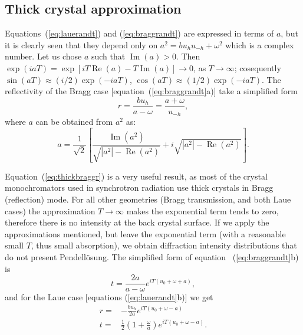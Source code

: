 \documentclass[preprint]{iucr}              %
\newcommand{\inred}[1]{{\color{red}#1}}
\begin{document}
\inred{
\subsection{Thick crystal approximation}\label{sec:thick}
}
Equations~(\ref{eq:lauerandt}) and (\ref{eq:braggrandt}) are expressed in terms of $a$, but it is clearly seen that they depend only on $a^2=bu_h u_{-h}+\omega^2$ which is a complex number. Let us chose $a$ such that $\operatorname{Im}(a)>0$. Then  
$\exp(iaT)=\exp[iT\operatorname{Re}(a)-T\operatorname{Im}(a)]\rightarrow 0$, as $T\rightarrow \infty$; cosequently $\sin(aT)\approx (i/2) \exp(-i a T)$, $\cos(aT)\approx (1/2) \exp(-i a T)$. The reflectivity of the Bragg case [equation~(\ref{eq:braggrandt}a)] take a simplified form
\begin{equation}\label{eq:thickbraggr}
    r = \frac{b u_h}{a-\omega} = \frac{a+\omega}{u_{-h}},
\end{equation}
where $a$ can be obtained from $a^2$ as: 
\begin{equation}
a = \frac{1}{\sqrt{2}} \left[ \frac{\operatorname{Im}(a^2)}{\sqrt{|a^2|-\operatorname{Re}(a^2)}} + i \sqrt{|a^2|-\operatorname{Re}(a^2)} \right].
\end{equation}

Equation~(\ref{eq:thickbraggr}) is a very useful result, as most of the crystal monochromators used in synchrotron radiation use thick crystals in Bragg (reflection) mode. For all other geometries (Bragg transmission, and both Laue cases) the approximation $T\rightarrow \infty$ makes the exponential term tends to zero, therefore there is no intensity at the back crystal surface. If we apply the approximations mentioned, but leave the exponential term (with a reasonable small $T$, thus small absorption), we obtain diffraction intensity distributions that do not present Pendell\"osung. The simplified form of equation~ (\ref{eq:braggrandt}b) is   
\begin{equation}\label{eq:thickbraggt}
    t = \frac{2a}{a-\omega} e^{i T (u_0+\omega+a)},
\end{equation}
and for the Laue case [equations (\ref{eq:lauerandt}b)] we get
\begin{subequations}
\label{eq:thicklaue}
\begin{align}
r = & - \frac{b u_h}{2 a} e^{iT (u_0+\omega-a)}  \\
t = & \frac{1}{2} (1 + \frac{\omega}{a})e^{i T (u_0+\omega-a)}.
\end{align}
\end{subequations}
\end{document}
